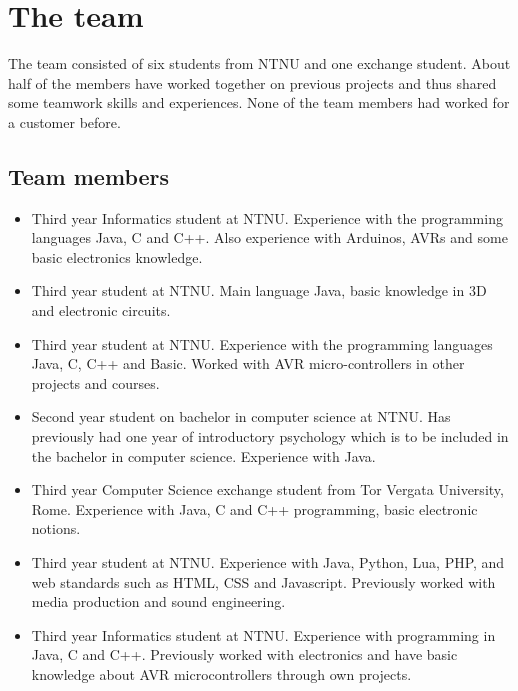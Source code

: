 \section{The team}
The team consisted of six students from NTNU and one exchange student.
About half of the members have worked together on previous projects and thus shared
some teamwork skills and experiences. None of the team members had worked for a customer before.

\subsection{Team members}

\begin{itemize}
\item{\anders}\newline
Third year Informatics student at NTNU. Experience with the programming languages Java,
C and C++. Also experience with Arduinos, AVRs and some basic electronics knowledge.

\item{\henrik}\newline
Third year student at NTNU. Main language Java, basic knowledge in 3D and electronic circuits.

\item{\johan}\newline
Third year student at NTNU. Experience with the programming languages Java, C, C++  and
Basic. Worked with AVR micro-controllers in other projects and courses.

\item{\asbjorn}\newline
Second year student on bachelor in computer science at NTNU. Has previously had one year of
introductory psychology which is to be included in the bachelor in computer science.
Experience with Java.

\item{\emanuele}\newline
Third year Computer Science exchange student from Tor Vergata University, Rome.
Experience with Java, C and C++ programming, basic electronic notions.

\item{\jonas}\newline
Third year student at NTNU. Experience with Java, Python, Lua, PHP, and web standards such as HTML, 
CSS and Javascript. Previously worked with media production and sound engineering.

\item{\bjornar}\newline
Third year Informatics student at NTNU. Experience with programming in Java, C and C++.
Previously worked with electronics and have basic knowledge about AVR microcontrollers through
own projects.
\end{itemize}

